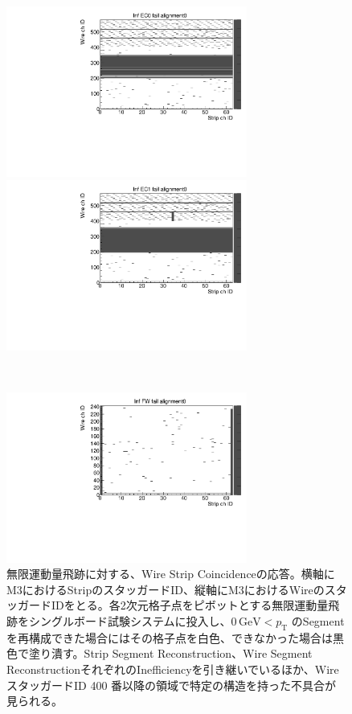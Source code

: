 \begin{figure}
    \begin{minipage}[b]{.5\linewidth}
        \centering
        \includegraphics[height=5.6cm]{fig/Test/B_InfEC0_WS.pdf}
    \end{minipage}
    \begin{minipage}[b]{.5\linewidth}
        \centering
        \includegraphics[height=5.6cm]{fig/Test/B_InfEC1_WS.pdf}
    \end{minipage}\\
    \begin{minipage}[b]{\linewidth}
        \centering
        \includegraphics[height=5.6cm]{fig/Test/B_InfFW_WS.pdf}
    \end{minipage}
    \caption[無限運動量飛跡に対する、Wire Strip Coincidenceの応答]{無限運動量飛跡に対する、Wire Strip Coincidenceの応答。横軸にM3におけるStripのスタッガードID、縦軸にM3におけるWireのスタッガードIDをとる。各2次元格子点をピボットとする無限運動量飛跡をシングルボード試験システムに投入し、$0\,\mathrm{GeV} < p_{\mathrm{T}}$ のSegmentを再構成できた場合にはその格子点を白色、できなかった場合は黒色で塗り潰す。Strip Segment Reconstruction、Wire Segment ReconstructionそれぞれのInefficiencyを引き継いでいるほか、Wire スタッガードID 400 番以降の領域で特定の構造を持った不具合が見られる。}
    \label{Inf_B_WS}
\end{figure}




